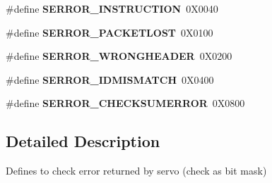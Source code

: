 \begin{DoxyCompactItemize}
\item 
\#define {\bfseries S\+E\+R\+R\+O\+R\+\_\+\+I\+N\+S\+T\+R\+U\+C\+T\+I\+ON}~0\+X0040\hypertarget{group__SERROR__GROUP_ga700b18e096ad99114131499058311fbf}{}\label{group__SERROR__GROUP_ga700b18e096ad99114131499058311fbf}

\item 
\#define {\bfseries S\+E\+R\+R\+O\+R\+\_\+\+P\+A\+C\+K\+E\+T\+L\+O\+ST}~0\+X0100\hypertarget{group__SERROR__GROUP_ga44f9f0354cf660b3e0af565d8358aa5d}{}\label{group__SERROR__GROUP_ga44f9f0354cf660b3e0af565d8358aa5d}

\item 
\#define {\bfseries S\+E\+R\+R\+O\+R\+\_\+\+W\+R\+O\+N\+G\+H\+E\+A\+D\+ER}~0\+X0200\hypertarget{group__SERROR__GROUP_ga2453d13a9841c9589382458b494571b6}{}\label{group__SERROR__GROUP_ga2453d13a9841c9589382458b494571b6}

\item 
\#define {\bfseries S\+E\+R\+R\+O\+R\+\_\+\+I\+D\+M\+I\+S\+M\+A\+T\+CH}~0\+X0400\hypertarget{group__SERROR__GROUP_ga08115676708915dd4be9d0cad1923c5d}{}\label{group__SERROR__GROUP_ga08115676708915dd4be9d0cad1923c5d}

\item 
\#define {\bfseries S\+E\+R\+R\+O\+R\+\_\+\+C\+H\+E\+C\+K\+S\+U\+M\+E\+R\+R\+OR}~0\+X0800\hypertarget{group__SERROR__GROUP_ga82069719a95b7b7dadf7a5590c35fdc4}{}\label{group__SERROR__GROUP_ga82069719a95b7b7dadf7a5590c35fdc4}

\end{DoxyCompactItemize}


\subsection{Detailed Description}
Defines to check error returned by servo (check as bit mask) 